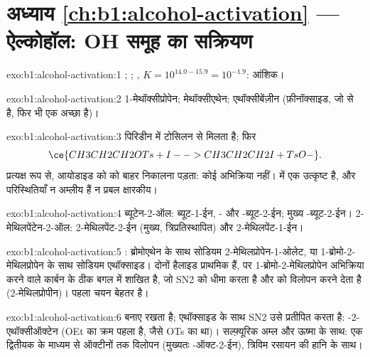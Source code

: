 \section*{अध्याय \ref{ch:b1:alcohol-activation} --- ऐल्कोहॉल: OH समूह का सक्रियण}

\begin{solution}{exo:b1:alcohol-activation:1}
;
;
, $K = 10^{14.0 - 15.9} = 10^{-1.9}$:
आंशिक।
\end{solution}

\begin{solution}{exo:b1:alcohol-activation:2}
1-मेथॉक्सीप्रोपेन; मेथॉक्सीएथेन; एथॉक्सीबेंज़ीन (फ़ीनॉक्साइड, जो  से
 है, फिर भी एक अच्छा  है)।
\end{solution}

\begin{solution}{exo:b1:alcohol-activation:3}
पिरिडीन में टोसिलन से  मिलता है; फिर
\[ \ce{CH3CH2CH2OTs + I- -> CH3CH2CH2I + TsO-}. \] प्रत्यक्ष रूप से, आयोडाइड को
 को बाहर निकालना पड़ता: कोई अभिक्रिया नहीं।  में एक उत्कृष्ट  है,
और परिस्थितियाँ न अम्लीय हैं न प्रबल क्षारकीय।
\end{solution}

\begin{solution}{exo:b1:alcohol-activation:4}
ब्यूटेन-2-ऑल: ब्यूट-1-ईन, - और -ब्यूट-2-ईन; मुख्य
-ब्यूट-2-ईन। 2-मेथिलपेंटेन-2-ऑल: 2-मेथिलपेंट-2-ईन (मुख्य,
त्रिप्रतिस्थापित) और 2-मेथिलपेंट-1-ईन।
\end{solution}

\begin{solution}{exo:b1:alcohol-activation:5}
: ब्रोमोएथेन के साथ सोडियम 2-मेथिलप्रोपेन-1-ओलेट,
या 1-ब्रोमो-2-मेथिलप्रोपेन के साथ सोडियम एथॉक्साइड। दोनों हैलाइड प्राथमिक हैं,
पर 1-ब्रोमो-2-मेथिलप्रोपेन अभिक्रिया करने वाले कार्बन के ठीक बगल में शाखित है,
जो SN2 को धीमा करता है और  को विलोपन करने देता है (2-मेथिलप्रोपीन)।
पहला चयन बेहतर है।
\end{solution}

\begin{solution}{exo:b1:alcohol-activation:6}
   बनाए रखता है; एथॉक्साइड के साथ SN2 उसे प्रतीपित
करता है: -2-एथॉक्सीऑक्टेन (OEt का क्रम पहला है, जैसे OTs का था)। सल्फ़्यूरिक अम्ल
और ऊष्मा के साथ: एक द्वितीयक  के माध्यम से ऑक्टीनों तक विलोपन
(मुख्यतः -ऑक्ट-2-ईन), त्रिविम रसायन की हानि के साथ।
\end{solution}

